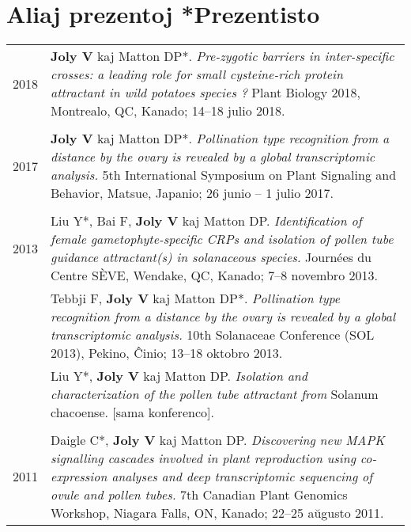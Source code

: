 \documentclass[letterpaper,12pt]{article}
\begin{document}
\vspace{6mm}

\section[Aliaj prezentoj]{Aliaj prezentoj \hfill \small{*Prezentisto}}

\begin{tabularx}{\textwidth}{@{}r|X@{}}

2018
& \textbf{Joly V} kaj Matton DP*.
  \emph{Pre-zygotic barriers in inter-specific crosses: a leading role for small
  cysteine-rich protein attractant in wild potatoes species ?}
  Plant Biology 2018, Montrealo, QC, Kanado;
  14–18 julio 2018.
  \\

\multicolumn{2}{c}{} \\

2017
& \textbf{Joly V} kaj Matton DP*.
  \emph{Pollination type recognition from a distance by the ovary is revealed
  by a global transcriptomic analysis.}
  5th International Symposium on Plant Signaling and Behavior, Matsue, Japanio;
  26 junio – 1 julio 2017.
  \\

\multicolumn{2}{c}{} \\

2013
& Liu Y*, Bai F, \textbf{Joly V} kaj Matton DP.
  \emph{Identification of female gametophyte-specific CRPs and isolation of
  pollen tube guidance attractant(s) in solanaceous species.}
  Journées du Centre SÈVE, Wendake, QC, Kanado;
  7–8 novembro 2013.
  \vspace{1.5mm}
  \\

& Tebbji F, \textbf{Joly V} kaj Matton DP*. \emph{Pollination type recognition
  from a distance by the ovary is revealed by a global transcriptomic analysis.}
  10th Solanaceae Conference (SOL 2013), Pekino, Ĉinio;
  13–18 oktobro 2013.
  \vspace{1.5mm}
  \\

& Liu Y*, \textbf{Joly V} kaj Matton DP.
  \emph{Isolation and characterization of the pollen tube attractant from}
  Solanum chacoense. [sama konferenco].
  \\

\multicolumn{2}{c}{} \\

2011
& Daigle C*, \textbf{Joly V} kaj Matton DP.
  \emph{Discovering new MAPK signalling cascades involved in plant reproduction
  using co-expression analyses and deep transcriptomic sequencing of ovule
  and pollen tubes.}
  7th Canadian Plant Genomics Workshop, Niagara Falls, ON, Kanado;
  22–25 aŭgusto 2011.
  \\

\end{tabularx}
\end{document}
